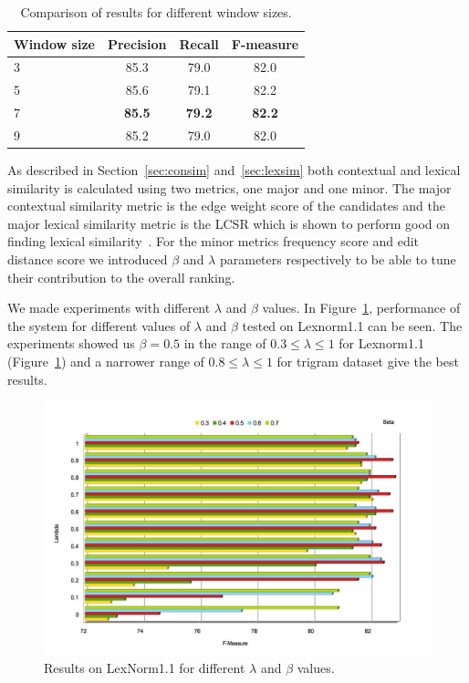 \documentclass[a4paper,onesided,12pt]{report}
\begin{document}
\begin{table}[htb]
  \caption{Comparison of results for different window sizes.}
  \centering
  \begin{tabular}[th]{|l|c|c|c|}
    \hline
    \textbf{Window size} & \textbf{Precision} & \textbf{Recall} & \textbf{F-measure} \\
    \hline
    3 & 85.3 & 79.0 & 82.0 \\\hline
    5 & 85.6 & 79.1 & 82.2 \\\hline
    7 & \textbf{85.5} &  \textbf{79.2} &  \textbf{82.2} \\\hline
    9 & 85.2 & 79.0  & 82.0 \\\hline
  \end{tabular}
\label{tab:windows}
\end{table}

As described in Section~\ref{sec:consim} and~\ref{sec:lexsim} both contextual and lexical similarity is calculated using two metrics, one major and one minor. The major contextual similarity metric is the edge weight score of the candidates and the major lexical similarity metric is the LCSR which is shown to perform good on finding lexical similarity~\cite{Han:2011:LNS:2002472.2002520,DBLP:conf/acl/HassanM13}. For the minor metrics frequency score and edit distance score we introduced $\beta$ and $\lambda$ parameters respectively to be able to tune their contribution to the overall ranking.

We made experiments with different $\lambda$ and $\beta$ values. In Figure~\ref{fig:lambeta}, performance of the system for different values of $\lambda$ and $\beta$ tested on Lexnorm1.1 can be seen. The experiments showed us $\beta = 0.5$ in the range of  $0.3 \leq \lambda \leq 1$ for Lexnorm1.1 (Figure~\ref{fig:lambeta}) and a narrower range of $0.8 \leq \lambda \leq 1$ for trigram dataset give the best results.

\begin{figure}[htb]
\begin{center}
\includegraphics[width=\linewidth]{fig/lambdasandbetas}
\caption{Results on LexNorm1.1 for different $\lambda$ and $\beta$ values.}
\label{fig:lambeta}
\end{center}
\end{figure}
\end{document}
